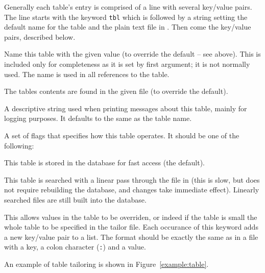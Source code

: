 Generally each table's entry is comprised of a line with several
key/value pairs.  The line starts with the keyword \verb+tbl+ which is
followed by a string setting the default name for the table and the
plain text file in .  Then come the key/value pairs,
described below.
\begin{describe}
\item[\verb+name=value+:]
Name this table with the given value (to override the default -- see
above). This is included only for completeness as it is set by first
argument; it is not normally used. The name is used in all references
to the table.

\item[\verb+file=value+:]
The tables contents are found in the given file (to override the default).

\item[\verb+show="value"+:]
A descriptive string used when printing
messages about this table, mainly for logging purposes.  It defaults
to the same as the table name.

\item[\verb+flags=value+:]
A set of flags that specifies how this table
operates. It should be one of the following:

\begin{describe}
\item[\verb+dbm+:]
This table is stored in the database for fast
access (the default).

\item[\verb+linear+:]
This table is searched with a linear pass through the file in
 (this is slow, but does not require rebuilding the
database, and changes take immediate effect). Linearly searched files
are still built into the database.

\end{describe}

\item[\verb|override|:]
This allows values in the table to be overriden, or indeed if the
table is small the whole table to be specified in the tailor file.
Each occurance of this keyword adds a new key/value pair to a list.
The format should be exactly the same as in a file with a key, a colon
character (\verb|:|) and a value.
\end{describe}

An example of table tailoring is shown in Figure~\ref{example:table}.

